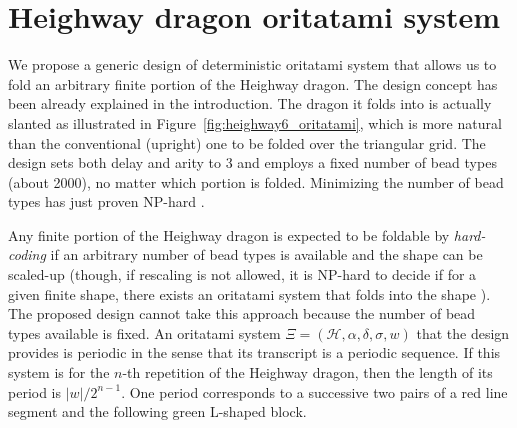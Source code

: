 	\section{Heighway dragon oritatami system}

We propose a generic design of deterministic oritatami system that allows us to fold an arbitrary finite portion of the Heighway dragon. 
The design concept has been already explained in the introduction. 
The dragon it folds into is actually slanted as illustrated in Figure~\ref{fig:heighway6_oritatami}, which is more natural than the conventional (upright) one to be folded over the triangular grid. 
The design sets both delay and arity to 3 and employs a fixed number of bead types (about 2000), no matter which portion is folded. 
Minimizing the number of bead types has just proven NP-hard \cite{HanKim2017}. 

Any finite portion of the Heighway dragon is expected to be foldable by \textit{hard-coding} if an arbitrary number of bead types is available and the shape can be scaled-up (though, if rescaling is not allowed, it is NP-hard to decide if for a given finite shape, there exists an oritatami system that folds into the shape \cite{PatitzRogers2017}). 
The proposed design cannot take this approach because the number of bead types available is fixed. 
An oritatami system $\Xi = (\mathcal{H}, \alpha, \delta, \sigma, w)$ that the design provides is periodic in the sense that its transcript is a periodic sequence. 
If this system is for the $n$-th repetition of the Heighway dragon, then the length of its period is $|w|/2^{n-1}$. 
One period corresponds to a successive two pairs of a red line segment and the following green L-shaped block. 


